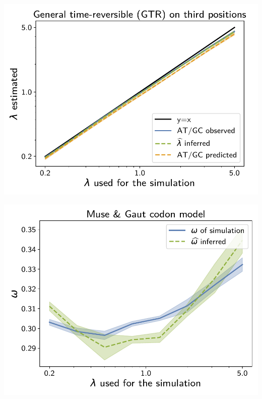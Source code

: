 \documentclass{article}
\begin{document}
\begin{center}
\begin{minipage}{0.325\linewidth}
    \end{minipage}
    \hfill
    \begin{minipage}{0.325\linewidth}
        \includegraphics[width=\linewidth, page=1]{inference_supp_mat/PrimatesExons20Mu1.0_lambda_GTR.pdf}
    \end{minipage}
    \hfill
    \begin{minipage}{0.325\linewidth}
        \includegraphics[width=\linewidth, page=1]{inference_supp_mat/PrimatesExons20Mu1.0_omega_MG.pdf}
    \end{minipage}

\end{center}
\end{document}
